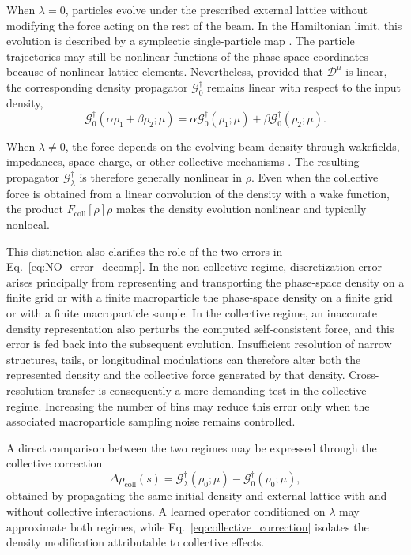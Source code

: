 When $\lambda=0$, particles evolve under the prescribed external lattice without modifying the force acting on the rest of the beam. In the Hamiltonian limit, this evolution is described by a symplectic single-particle map \cite{huang_symplectic_2024}. The particle trajectories
may still be nonlinear functions of the phase-space coordinates because of nonlinear lattice elements. Nevertheless, provided that $\mathcal{D}^{\mu}$ is linear, the corresponding density propagator $\mathcal{G}^{\dagger}_{0}$ remains linear with respect to the input density,
\begin{equation}
    \mathcal{G}^{\dagger}_{0}
    \left(
        \alpha\rho_1+\beta\rho_2;\mu
    \right)
    =
    \alpha\mathcal{G}^{\dagger}_{0}
    \left(
        \rho_1;\mu
    \right)
    +
    \beta\mathcal{G}^{\dagger}_{0}
    \left(
        \rho_2;\mu
    \right).
    \label{eq:noncollective_linearity}
\end{equation}

When $\lambda\neq0$, the force depends on the evolving beam density through wakefields, impedances, space charge, or other collective mechanisms \cite{metral_wake_2021,gibellieri_impact_fcc_heb}. The resulting propagator
$\mathcal{G}^{\dagger}_{\lambda}$ is therefore generally nonlinear in $\rho$. Even when the collective force is obtained from a linear convolution of the density with a wake function, the product $F_{\mathrm{coll}}[\rho]\rho$ makes the density evolution nonlinear and typically nonlocal.

This distinction also clarifies the role of the two errors in
Eq.~\eqref{eq:NO_error_decomp}. In the non-collective regime,
discretization error arises principally from representing and transporting the phase-space density on a finite grid or with a finite macroparticle the phase-space density on a finite grid or with a finite macroparticle sample. In the collective regime, an inaccurate density representation also perturbs the computed self-consistent force, and this error is fed back into the subsequent evolution. Insufficient resolution of narrow structures, tails, or longitudinal modulations can therefore alter both the represented density and the collective force generated by that density. Cross-resolution transfer is consequently a more demanding test in the collective regime. Increasing the number of bins may reduce this error only when the associated macroparticle sampling noise remains controlled.

A direct comparison between the two regimes may be expressed through the collective correction
\begin{equation}
    \Delta\rho_{\mathrm{coll}}(s)
    =
    \mathcal{G}^{\dagger}_{\lambda}
    \left(
        \rho_0;\mu
    \right)
    -
    \mathcal{G}^{\dagger}_{0}
    \left(
        \rho_0;\mu
    \right),
    \label{eq:collective_correction}
\end{equation}
obtained by propagating the same initial density and external lattice with and without collective interactions. A learned operator conditioned on $\lambda$ may approximate both regimes, while Eq.~\eqref{eq:collective_correction} isolates the density modification attributable to collective effects.


